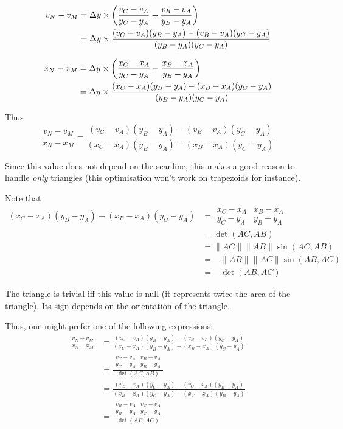 \begin{align*}
v_N - v_M & = \Delta y \times \left(\frac{v_C - v_A}{y_C - y_A} - \frac{v_B - v_A}{y_B - y_A}\right) \\
& = \Delta y \times \frac{(v_C - v_A)(y_B - y_A) - (v_B - v_A)(y_C - y_A)}{(y_B - y_A)(y_C - y_A)} \\
\end{align*}

\begin{align*}
x_N - x_M & = \Delta y \times \left(\frac{x_C - x_A}{y_C - y_A} - \frac{x_B - x_A}{y_B - y_A}\right) \\
& = \Delta y \times \frac{(x_C - x_A)(y_B - y_A) - (x_B - x_A)(y_C - y_A)}{(y_B - y_A)(y_C - y_A)}
\end{align*}

Thus
\begin{displaymath}
  \frac{v_N - v_M}{x_N - x_M} = \frac{(v_C - v_A)(y_B - y_A) - (v_B - v_A)(y_C - y_A)}{(x_C - x_A)(y_B - y_A) - (x_B - x_A)(y_C - y_A)}
\end{displaymath}

Since this value does not depend on the scanline, this makes a good
reason to handle \emph{only} triangles (this optimisation won't work
on trapezoids for instance).

\smallskip 

Note that
\begin{align*}
(x_C - x_A)(y_B - y_A) - (x_B - x_A)(y_C - y_A) & =
\begin{array}{|cc|} 
  x_C - x_A & x_B - x_A \\
  y_C - y_A & y_B - y_A
\end{array}
\\
& = \det(AC, AB) \\
& = \|AC\| \|AB\| \sin(AC,AB) \\
& = - \|AB\| \|AC\| \sin(AB,AC) \\
& = - \det(AB, AC)
\end{align*}

The triangle is trivial iff this value is null (it represents twice
the area of the triangle). Its sign depends on the orientation of the
triangle.

Thus, one might prefer one of the following expressions:
\begin{align*}
\frac{v_N - v_M}{x_N - x_M} 
& = \frac{(v_C - v_A)(y_B - y_A) - (v_B - v_A)(y_C - y_A)}{(x_C - x_A)(y_B - y_A) - (x_B - x_A)(y_C - y_A)} \\
& = \frac{\begin{array}{|cc|} v_C - v_A & v_B - v_A \\ y_C - y_A & y_B - y_A \end{array}}{\det(AC,AB)} \\
& = \frac{(v_B - v_A)(y_C - y_A) - (v_C - v_A)(y_B - y_A)}{(x_B - x_A)(y_C - y_A) - (x_C - x_A)(y_B - y_A)} \\
& = \frac{\begin{array}{|cc|} v_B - v_A & v_C - v_A \\ y_B - y_A & y_C - y_A \end{array}}{\det(AB,AC)} \\
\end{align*}

